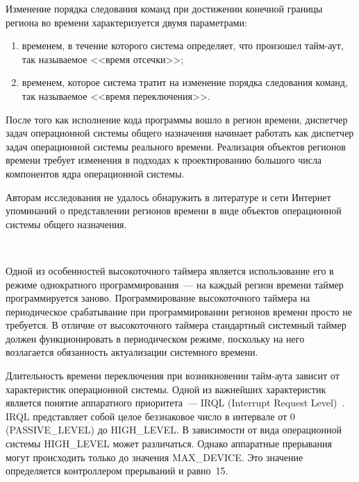 \begin{multicols}{2}
   Изменение порядка следования команд при достижении конечной границы региона во времени
характеризуется двумя параметрами:
   \begin{enumerate}[(1)]
\item временем, в течение которого система определяет, что произошел тайм-аут, так
называемое <<время отсечки>>;
\item временем, которое система тратит на изменение порядка следования команд, так
на\-зы\-ва\-емое <<время переключения>>.
   \end{enumerate}

   После того как исполнение кода программы вошло в регион времени, диспетчер задач
операционной системы общего назначения начинает работать как диспетчер задач операционной
системы реального времени. Реализация объектов регионов времени требует изменения в
подходах к проектированию большого числа компонентов ядра операционной системы.

   Авторам исследования не удалось обнаружить в литературе и сети Интернет упоминаний о
пред\-став\-ле\-нии регионов времени в виде объектов операционной системы общего назначения.

\begin{figure*} %
\vspace*{1pt}
\begin{center}
\mbox{%
\epsfxsize=110.522mm
}
\end{center}
\vspace*{-9pt}
   \end{figure*}

Одной из особенностей высокоточного таймера является использование его в режиме
од\-но\-крат\-ного программирования~--- на каждый регион време\-ни таймер программируется заново.
Про\-грам\-ми\-ро\-ва\-ние высокоточного таймера на пе\-ри\-оди\-ческое %
сраба\-ты\-ва\-ние при
программировании регионов времени просто не требуется. В отличие от вы\-со\-ко\-точ\-но\-го таймера
стандартный системный таймер должен функционировать в периодическом режиме, поскольку на
него возлагается обязанность актуализации системного времени.

   Длительность времени переключения при возникновении тайм-аута зависит от характеристик
операционной системы. Одной из важнейших характеристик является понятие аппаратного
приоритета~--- IRQL (Interrupt Request Level)~\cite{3eg}. IRQL представляет собой целое
беззнаковое число в интервале от 0 (PASSIVE\_LEVEL) до HIGH\_LEVEL. В зависимости от вида
операционной системы HIGH\_LEVEL может различаться. Однако аппаратные прерывания могут
происходить только до значения MAX\_DEVICE. Это значение определяется контроллером
прерываний и равно~15.


\end{multicols}
